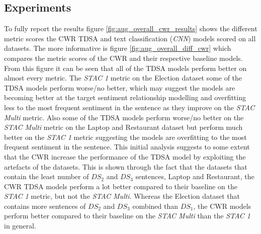 \FloatBarrier
\subsection{Experiments}
To fully report the results figure \ref{fig:aug_overall_cwr_results} shows the different metric scores the CWR TDSA and text classification (\textit{CNN}) models scored on all datasets. The more informative is figure \ref{fig:aug_overall_diff_cwr} which compares the metric scores of the CWR and their respective baseline models. From this figure it can be seen that all of the TDSA models perform better on almost every metric. The \textit{STAC 1} metric on the Election dataset some of the TDSA models perform worse/no better, which may suggest the models are becoming better at the target sentiment relationship modelling and overfitting less to the most frequent sentiment in the sentence as they improve on the \textit{STAC Multi} metric. Also some of the TDSA models perform worse/no better on the \textit{STAC Multi} metric on the Laptop and Restaurant dataset but perform much better on the \textit{STAC 1} metric suggesting the models are overfitting to the most frequent sentiment in the sentence. This initial analysis suggests to some extent that the CWR increase the performance of the TDSA model by exploiting the artefacts of the datasets. This is shown through the fact that the datasets that contain the least number of $DS_2$ and $DS_3$ sentences, Laptop and Restaurant, the CWR TDSA models perform a lot better compared to their baseline on the \textit{STAC 1} metric, but not the \textit{STAC Multi}. Whereas the Election dataset that contains more sentences of $DS_2$ and $DS_3$ combined than $DS_1$, the CWR models perform better compared to their baseline on the \textit{STAC Multi} than the \textit{STAC 1} in general. 

